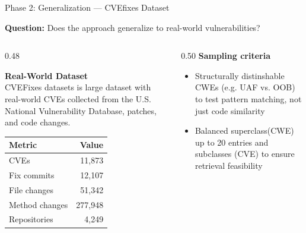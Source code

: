 \documentclass[aspectratio=169,10pt]{beamer}
\begin{document}
\begin{frame}{Phase 2: Generalization — CVEfixes Dataset}
  
  \textbf{Question:} Does the approach generalize to real-world vulnerabilities?
  \vspace{0.3cm}
  
\begin{columns}[T]
\begin{column}{0.48\textwidth}

  \textbf{Real-World Dataset}\\[3pt]
  {\small CVEFixes \cite{bhandari2021cvefixes} datasets is large dataset with real-world CVEs collected from the U.S. National Vulnerability Database, patches, and code changes.\\}
  
  \vspace{0.5em}
  \begin{center}
    
  \scriptsize
  \begin{tabular}{lr}
    \toprule
    \textbf{Metric} & \textbf{Value} \\
    \midrule
    CVEs & 11,873 \\
    Fix commits & 12,107 \\
    File changes & 51,342 \\
    Method changes & 277,948 \\
    Repositories & 4,249 \\
    \bottomrule
  \end{tabular}
  \end{center}
\end{column}
\begin{column}{0.50\textwidth}
    {\small\textbf{Sampling criteria}}\\[3pt]
  {\scriptsize
  \begin{itemize}\itemsep1pt
    \item Structurally distinshable CWEs (e.g. UAF vs. OOB) to test pattern matching, not just code similarity
    \item Balanced superclass(CWE) up to 20 entries and subclasses (CVE) to ensure retrieval feasibility
  \end{itemize}}
      \vspace{0.5em}
    \begin{center}


\end{center}
\end{column}
\end{columns}
\end{frame}
\end{document}
